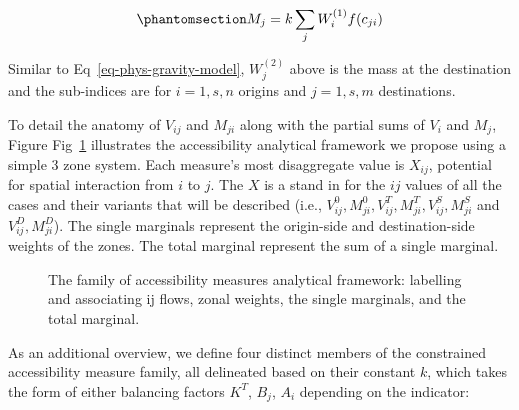 \documentclass[
  10pt,
  letterpaper,
]{article}
\begin{document}
\begin{equation}\phantomsection\label{eq-market-potential-01}{
M_{j} = k \sum_j W_i^{(1)} f(c_{ji})
}\end{equation}

Similar to Eq~\ref{eq-phys-gravity-model}, \(W_j^{(2)}\) above is the
mass at the destination and the sub-indices are for \(i = 1,s, n\)
origins and \(j = 1,s, m\) destinations.

To detail the anatomy of \(V_{ij}\) and \(M_{ji}\) along with the
partial sums of \(V_i\) and \(M_j\), Figure
Fig~\ref{fig-analytical-device-conc-accessibility} illustrates the
accessibility analytical framework we propose using a simple 3 zone
system. Each measure's most disaggregate value is \(X_{ij}\), potential
for spatial interaction from \(i\) to \(j\). The \(X\) is a stand in for
the \(ij\) values of all the cases and their variants that will be
described (i.e.,
\(V_{ij}^0, M_{ji}^0, V_{ij}^T, M_{ji}^T, V_{ij}^S, M_{ji}^S\) and
\(V_{ij}^D, M_{ji}^D\)). The single marginals represent the origin-side
and destination-side weights of the zones. The total marginal represent
the sum of a single marginal.

\begin{figure}[H]


\caption{\label{fig-analytical-device-conc-accessibility}The family of
accessibility measures analytical framework: labelling and associating
ij flows, zonal weights, the single marginals, and the total marginal.}

\end{figure}%

As an additional overview, we define four distinct members of the
constrained accessibility measure family, all delineated based on their
constant \(k\), which takes the form of either balancing factors
\(K^T\), \(B_j\), \(A_i\) depending on the indicator:
\end{document}
